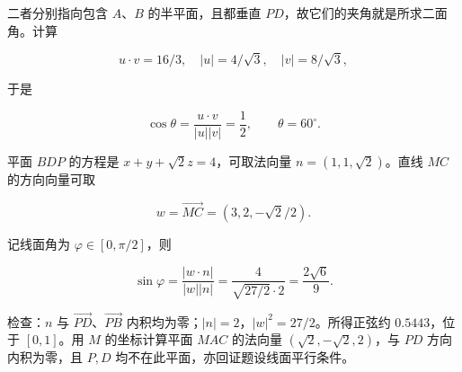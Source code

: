 \begin{answer}
二者分别指向包含 $A$、$B$ 的半平面，且都垂直 $PD$，故它们的夹角就是所求二面角。计算

\nopagebreak[4]
\[u\cdot v=16/3,\quad |u|=4/\sqrt3,\quad |v|=8/\sqrt3,\]

于是

\nopagebreak[4]
\[\cos\theta=\frac{u\cdot v}{|u||v|}=\frac12,\qquad\boxed{\theta=60^\circ}.\]


平面 $BDP$ 的方程是 $x+y+\sqrt2z=4$，可取法向量 $n=(1,1,\sqrt2)$。直线 $MC$ 的方向向量可取

\nopagebreak[4]
\[w=\overrightarrow{MC}=(3,2,-\sqrt2/2).\]

记线面角为 $\varphi\in[0,\pi/2]$，则

\nopagebreak[4]
\[
\sin\varphi=\frac{|w\cdot n|}{|w||n|}
=\frac{4}{\sqrt{27/2}\cdot2}
=\boxed{\frac{2\sqrt6}{9}}.
\]

检查：$n$ 与 $\overrightarrow{PD}$、$\overrightarrow{PB}$ 内积均为零；$|n|=2$，$|w|^2=27/2$。所得正弦约 $0.5443$，位于 $[0,1]$。用 $M$ 的坐标计算平面 $MAC$ 的法向量 $(\sqrt2,-\sqrt2,2)$，与 $PD$ 方向内积为零，且 $P,D$ 均不在此平面，亦回证题设线面平行条件。




\end{answer}
